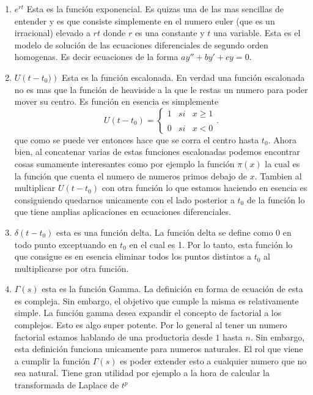 \documentclass{report}
\begin{document}
\begin{enumerate}
  \item $e^{rt}$ Esta es la función exponencial. Es quizas una de las mas sencillas de entender y es que consiste simplemente en el numero euler (que es un irracional) elevado a $rt$ donde $r$ es una constante y $t$ una variable. Esta es el modelo de solución de las ecuaciones diferenciales de segundo orden homogenas. Es decir ecuaciones de la forma $a y'' + b y' + c y = 0$.
  \item  $U\left( t-t_0) \right) $ Esta es la función escalonada. En verdad una función escalonada no es mas que la función de heaviside a la que le restas un numero para poder mover su centro. Es función en esencia es simplemente \[
  U(t-t_0)= \left\{ \begin{array}{lcc} 1 & si & x \ge 1 \\ \\ 0 & si & x < 0 \end{array} \right.
  .\] que como se puede ver entonces hace que se corra el centro hasta $t_0$. Ahora bien, al concatenar varias de estas funciones escalonadas podemos encontrar cosas sumamente interesantes como por ejemplo la función $\pi\left( x \right) $ la cual es la función que cuenta el numero de numeros primos debajo de $x$. Tambien al multiplicar $U\left( t-t_0 \right) $ con otra función lo que estamos haciendo en esencia es consiguiendo quedarnos unicamente con el lado posterior a $t_0$ de la función lo que tiene amplias aplicaciones en ecuaciones diferenciales.
\item $\delta\left( t-t_0 \right) $ esta es una función delta. La función delta se define como 0 en todo punto exceptuando en $t_0$ en el cual es 1. Por lo tanto, esta función lo que consigue es en esencia eliminar todos los puntos distintos a $t_0$ al multiplicarse por otra función.
\item $\Gamma\left( s \right) $ esta es la función Gamma. La definición en forma de ecuación de esta es compleja. Sin embargo, el objetivo que cumple la misma es relativamente simple. La función gamma desea expandir el concepto de factorial a los complejos. Esto es algo super potente. Por lo general al tener un numero factorial estamos hablando de una productoria desde $1$ hasta  $n$. Sin embargo, esta definición funciona unicamente para numeros naturales. El rol que viene a cumplir la función $\Gamma\left( s \right) $ es poder extender esto a cualquier numero que no sea natural. Tiene gran utilidad por ejemplo a la hora de calcular la transformada de Laplace de $t^{p}$
\end{enumerate}
\end{document}
